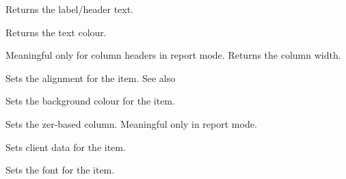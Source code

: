 \label{wxlistitemgettext}


Returns the label/header text.



\label{wxlistitemgettextcolour}


Returns the text colour.



\label{wxlistitemgetwidth}


Meaningful only for column headers in report mode. Returns the column width.



\label{wxlistitemsetalign}


Sets the alignment for the item. See also



\label{wxlistitemsetbackgroundcolour}


Sets the background colour for the item.



\label{wxlistitemsetcolumn}


Sets the zer-based column. Meaningful only in report mode.



\label{wxlistitemsetdata}



Sets client data for the item.



\label{wxlistitemsetfont}


Sets the font for the item.



